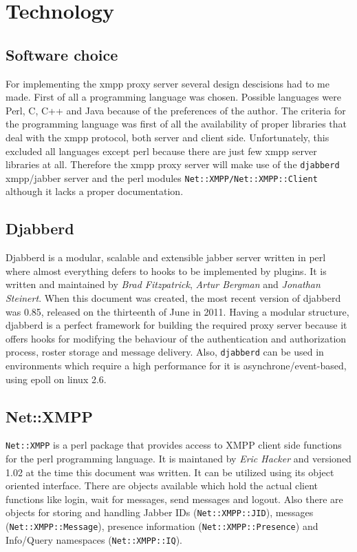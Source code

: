 \documentclass[a4paper,10pt,numbers=noendperiod]{scrartcl}
\begin{document}
\section{Technology}
\subsection{Software choice}
For implementing the xmpp proxy server several design descisions had to me made. First of all a programming language was chosen. Possible languages were Perl, C, C++ and Java because of the preferences of the author. The criteria for the programming language was first of all the availability of proper libraries that deal with the xmpp protocol, both server and client side.  Unfortunately, this excluded all languages except perl because there are just few xmpp server libraries at all. Therefore the xmpp proxy server will make use of the \texttt{djabberd} xmpp/jabber server and the perl modules \texttt{Net::XMPP/Net::XMPP::Client} although it lacks a proper documentation.
\subsection{Djabberd}
Djabberd is a modular, scalable and extensible jabber server written in perl where almost everything defers to hooks to be implemented by plugins. %
It is written and maintained by \textit{Brad Fitzpatrick}, \textit{Artur Bergman} and \textit{Jonathan Steinert}.
When this document was created, the most recent version of djabberd was 0.85, released on the thirteenth of June in 2011. Having a modular structure, djabberd is a perfect framework for building the required proxy server because it offers hooks for modifying the behaviour of the authentication and authorization process, roster storage and message delivery. Also, \texttt{djabberd} can be used in environments which require a high performance for it is asynchrone/event-based, using epoll on linux 2.6.

\subsection{Net::XMPP}
\texttt{Net::XMPP} is a perl package that provides access to XMPP client side functions for the perl programming language. It is maintaned by \textit{Eric Hacker} and versioned 1.02 at the time this document was written.
It can be utilized using its object oriented interface. 
There are objects available which hold the actual client functions like login, wait for messages, send messages and logout. 
Also there are objects for storing and handling Jabber IDs (\texttt{Net::XMPP::JID}), messages (\texttt{Net::XMPP::Message}), presence information (\texttt{Net::XMPP::Presence}) and Info/Query namespaces (\texttt{Net::XMPP::IQ}).  
\end{document}
